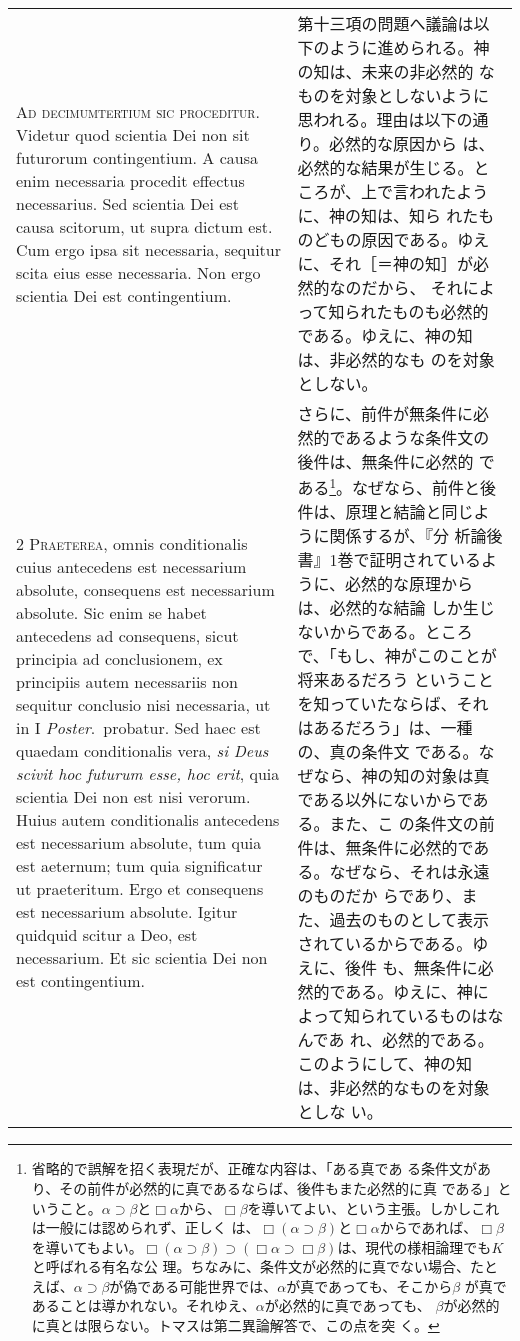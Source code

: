 \documentclass[10pt]{jsarticle} %
\begin{document}
\begin{longtable}{p{21em}p{21em}}


{\huge A}{\scshape d decimumtertium sic proceditur}. Videtur
quod scientia Dei non sit futurorum contingentium. A causa enim
necessaria procedit effectus necessarius. Sed scientia Dei est causa
scitorum, ut supra dictum est. Cum ergo ipsa sit necessaria, sequitur
scita eius esse necessaria. Non ergo scientia Dei est contingentium.

&

第十三項の問題へ議論は以下のように進められる。神の知は、未来の非必然的
なものを対象としないように思われる。理由は以下の通り。必然的な原因から
は、必然的な結果が生じる。ところが、上で言われたように、神の知は、知ら
れたものどもの原因である。ゆえに、それ［＝神の知］が必然的なのだから、
それによって知られたものも必然的である。ゆえに、神の知は、非必然的なも
のを対象としない。

\\


2 {\scshape Praeterea}, omnis conditionalis cuius antecedens est
necessarium absolute, consequens est necessarium absolute. Sic enim se
habet antecedens ad consequens, sicut principia ad conclusionem, ex
principiis autem necessariis non sequitur conclusio nisi necessaria, ut
in I {\itshape Poster}.~probatur. Sed haec est quaedam conditionalis
vera, {\itshape si Deus scivit hoc futurum esse, hoc erit}, quia
scientia Dei non est nisi verorum. Huius autem conditionalis antecedens
est necessarium absolute, tum quia est aeternum; tum quia significatur
ut praeteritum. Ergo et consequens est necessarium absolute. Igitur
quidquid scitur a Deo, est necessarium. Et sic scientia Dei non est
contingentium.


&

さらに、前件が無条件に必然的であるような条件文の後件は、無条件に必然的
である\footnote{省略的で誤解を招く表現だが、正確な内容は、「ある真であ
る条件文があり、その前件が必然的に真であるならば、後件もまた必然的に真
である」ということ。$\alpha \supset \beta$と$\Box \alpha$から、$\Box
\beta$を導いてよい、という主張。しかしこれは一般には認められず、正しく
は、$\Box (\alpha \supset \beta)$と$\Box \alpha$からであれば、$\Box
\beta$を導いてもよい。$\Box (\alpha \supset \beta) \supset (\Box
\alpha \supset \Box \beta)$は、現代の様相論理でも$K$と呼ばれる有名な公
理。ちなみに、条件文が必然的に真でない場合、たとえば、$\alpha \supset
\beta$が偽である可能世界では、$\alpha$が真であっても、そこから$\beta$
が真であることは導かれない。それゆえ、$\alpha$が必然的に真であっても、
$\beta$が必然的に真とは限らない。トマスは第二異論解答で、この点を突
く。}。なぜなら、前件と後件は、原理と結論と同じように関係するが、『分
析論後書』1巻で証明されているように、必然的な原理からは、必然的な結論
しか生じないからである。ところで、「もし、神がこのことが将来あるだろう
ということを知っていたならば、それはあるだろう」は、一種の、真の条件文
である。なぜなら、神の知の対象は真である以外にないからである。また、こ
の条件文の前件は、無条件に必然的である。なぜなら、それは永遠のものだか
らであり、また、過去のものとして表示されているからである。ゆえに、後件
も、無条件に必然的である。ゆえに、神によって知られているものはなんであ
れ、必然的である。このようにして、神の知は、非必然的なものを対象としな
い。


\end{longtable}
\end{document}
